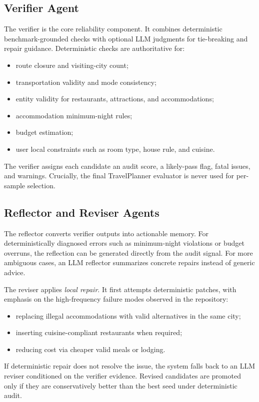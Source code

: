 \documentclass{article}
\begin{document}
\subsection{Verifier Agent}
The verifier is the core reliability component. It combines deterministic benchmark-grounded checks with optional LLM judgments for tie-breaking and repair guidance. Deterministic checks are authoritative for:
\begin{itemize}[leftmargin=1.5em]
    \item route closure and visiting-city count;
    \item transportation validity and mode consistency;
    \item entity validity for restaurants, attractions, and accommodations;
    \item accommodation minimum-night rules;
    \item budget estimation;
    \item user local constraints such as room type, house rule, and cuisine.
\end{itemize}
The verifier assigns each candidate an audit score, a likely-pass flag, fatal issues, and warnings. Crucially, the final TravelPlanner evaluator is never used for per-sample selection.

\subsection{Reflector and Reviser Agents}
The reflector converts verifier outputs into actionable memory. For deterministically diagnosed errors such as minimum-night violations or budget overruns, the reflection can be generated directly from the audit signal. For more ambiguous cases, an LLM reflector summarizes concrete repairs instead of generic advice.

The reviser applies \emph{local repair}. It first attempts deterministic patches, with emphasis on the high-frequency failure modes observed in the repository:
\begin{itemize}[leftmargin=1.5em]
    \item replacing illegal accommodations with valid alternatives in the same city;
    \item inserting cuisine-compliant restaurants when required;
    \item reducing cost via cheaper valid meals or lodging.
\end{itemize}
If deterministic repair does not resolve the issue, the system falls back to an LLM reviser conditioned on the verifier evidence. Revised candidates are promoted only if they are conservatively better than the best seed under deterministic audit.
\end{document}
